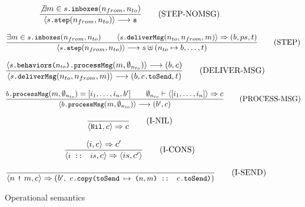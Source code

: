 \begin{figure}[!h]
\begin{framed}
 
\begin{equation}
\dfrac{
  \not\exists m \in \texttt{\small{$s$.inboxes}}(n_{from}, n_{to})
}{
  \langle \texttt{\small{$s$.step}}(n_{from}, n_{to}) \rangle \longrightarrow \texttt{\small{s}}
}
\tag{STEP-NOMSG}
\end{equation}

\vspace{10pt}
\begin{equation}
\dfrac{
  \exists m \in \texttt{\small{$s$.inboxes}}(n_{from}, n_{to}) \qquad
  \langle \texttt{\small{$s$.deliverMsg}}(n_{to}, n_{from}, m) \rangle \Rightarrow (b, ps, t)
}{
  \langle \texttt{\small{$s$.step}}(n_{from}, n_{to}) \rangle \longrightarrow s \uplus (n_{to} \mapsto b, \ldots, t)
}
\tag{STEP}
\end{equation}

\vspace{10pt}
\begin{equation}
\dfrac{
  \langle \texttt{\small{$s$.behaviors($n_{to}$).processMsg}}(m, \emptyset_{n_{to}}) \rangle \longrightarrow (b, c) 
}{
   \langle \texttt{\small{$s$.deliverMsg}}(n_{to}, n_{from}, m) \rangle \longrightarrow (b, \texttt{\small{$c$.toSend}}, t)
}
\tag{DELIVER-MSG}
\end{equation}

\vspace{10pt}
\begin{equation}
\dfrac{
  \texttt{\small{$b$.processMsg}}(m, \emptyset_{n_{to}}) = [i_1, \ldots, i_n, b'] \qquad
  \emptyset_{n_{to}} \vdash \langle [i_1, \ldots, i_n] \rangle \Rightarrow c
}{
   \langle \texttt{\small{$b$.processMsg}}(m, \emptyset_{n_{to}}) \rangle \longrightarrow (b', c)
}
\tag{PROCESS-MSG}
\end{equation}

\vspace{10pt}
\begin{equation}
\dfrac{\empty}{
   \langle \stt{Nil}, c \rangle \Rightarrow c
}
\tag{I-NIL}
\end{equation}

\vspace{10pt}
\begin{equation}
\dfrac{
  \langle i, c \rangle \Rightarrow c'
}{
  \langle \texttt{\small{$i$ :: $is$}}, c \rangle \Rightarrow \langle is, c' \rangle
}
\tag{I-CONS}
\end{equation}

\vspace{10pt}
\begin{equation}
\dfrac{\empty}{
   \langle n\ \stt{!}\ m, c \rangle \Rightarrow (b',\ \stt{$c$.copy(toSend $\mapsto$ ($n, m$) :: $c$.toSend)})
}
\tag{I-SEND}
\end{equation}

\end{framed}
\vspace{-10pt}
\caption{Operational semantics\label{fig:opsem}}
\end{figure}

